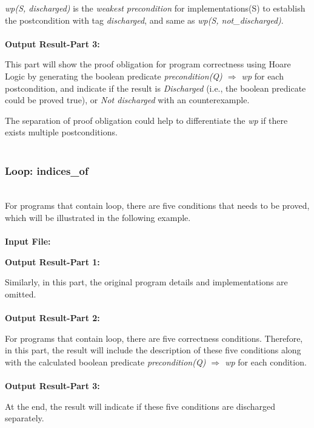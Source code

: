 \emph{wp(S, discharged)} is the \emph{weakest precondition} for implementations(S) to establish the postcondition with tag \emph{discharged}, and same as \emph{wp(S, not\_discharged)}.\\\\
{\bf Output Result-Part 3:}

\hspace{4mm}{\bf Part 3:} This part will show the proof obligation for program correctness using Hoare Logic by generating the boolean predicate  \emph{precondition(Q) $\Rightarrow$ wp} for each postcondition, and indicate if the result is \emph{Discharged} (i.e., the boolean predicate could be proved true), or \emph{Not discharged} with an counterexample.

The separation of proof obligation could help to differentiate the \emph{wp} if there exists multiple postconditions.\\\\

\subsubsection{Loop: indices\_of}
~\\
\hspace{4mm}For programs that contain loop, there are five conditions that needs to be proved, which will be illustrated in the following example.\\\\
{\bf Input File:}

{\bf Output Result-Part 1:}

\hspace{4mm}{\bf Part 1:} Similarly, in this part, the original program details and implementations are omitted.\\\\
{\bf Output Result-Part 2:}

\hspace{4mm}{\bf Part 2:} For programs that contain loop, there are five correctness conditions. Therefore, in this part, the result will include the description of these five conditions along with the calculated boolean predicate \emph{precondition(Q) $\Rightarrow$ wp} for each condition.\\\\
{\bf Output Result-Part 3:}

\hspace{4mm}{\bf Part 3:} At the end, the result will indicate if these five conditions are discharged separately.

